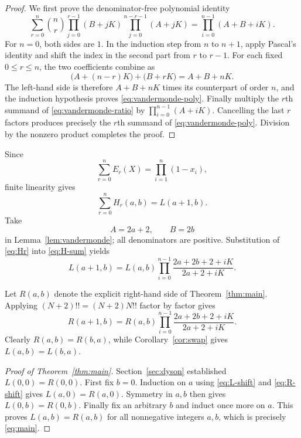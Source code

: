 \documentclass[11pt,a4paper]{article}
\theoremstyle{definition}
\begin{document}
\begin{proof}
We first prove the denominator-free polynomial identity
\begin{equation}\label{eq:vandermonde-poly}
\sum_{r=0}^{n}\binom nr
\prod_{j=0}^{r-1}(B+jK)
\prod_{j=0}^{n-r-1}(A+jK)
=\prod_{i=0}^{n-1}(A+B+iK).
\end{equation}
For $n=0$, both sides are $1$.  In the induction step from $n$ to
$n+1$, apply Pascal's identity and shift the index in the second
part from $r$ to $r-1$.  For each fixed $0\le r\le n$, the two
coefficients combine as
\[
\bigl(A+(n-r)K\bigr)+\bigl(B+rK\bigr)=A+B+nK.
\]
The left-hand side is therefore $A+B+nK$ times its counterpart of
order $n$, and the induction hypothesis proves
\eqref{eq:vandermonde-poly}.  Finally multiply the $r$th summand of
\eqref{eq:vandermonde-ratio} by
$\prod_{i=0}^{n-1}(A+iK)$.  Cancelling the last $r$ factors produces
precisely the $r$th summand of \eqref{eq:vandermonde-poly}.  Division
by the nonzero product completes the proof.
\end{proof}

Since
\[
\sum_{r=0}^{n}E_r(X)=\prod_{i=1}^{n}(1-x_i),
\]
finite linearity gives
\begin{equation}\label{eq:H-sum}
\sum_{r=0}^{n}H_r(a,b)=L(a+1,b).
\end{equation}
Take
\[
A=2a+2,\qquad B=2b
\]
in Lemma~\ref{lem:vandermonde}; all denominators are positive.
Substitution of \eqref{eq:Hr} into \eqref{eq:H-sum} yields
\begin{equation}\label{eq:L-shift}
L(a+1,b)=L(a,b)
\prod_{i=0}^{n-1}
\frac{2a+2b+2+iK}{2a+2+iK}.
\end{equation}

Let $R(a,b)$ denote the explicit right-hand side of
Theorem~\ref{thm:main}.  Applying $(N+2)!!=(N+2)N!!$ factor by factor
gives
\begin{equation}\label{eq:R-shift}
R(a+1,b)=R(a,b)
\prod_{i=0}^{n-1}
\frac{2a+2b+2+iK}{2a+2+iK}.
\end{equation}
Clearly $R(a,b)=R(b,a)$, while Corollary~\ref{cor:swap} gives
$L(a,b)=L(b,a)$.

\begin{proof}[Proof of Theorem~\ref{thm:main}]
Section~\ref{sec:dyson} established $L(0,0)=R(0,0)$.  First fix
$b=0$.  Induction on $a$ using \eqref{eq:L-shift} and
\eqref{eq:R-shift} gives $L(a,0)=R(a,0)$.  Symmetry in $a,b$ then gives
$L(0,b)=R(0,b)$.  Finally fix an arbitrary $b$ and induct once more on
$a$.  This proves $L(a,b)=R(a,b)$ for all nonnegative integers $a,b$,
which is precisely \eqref{eq:main}.
\end{proof}
\end{document}
